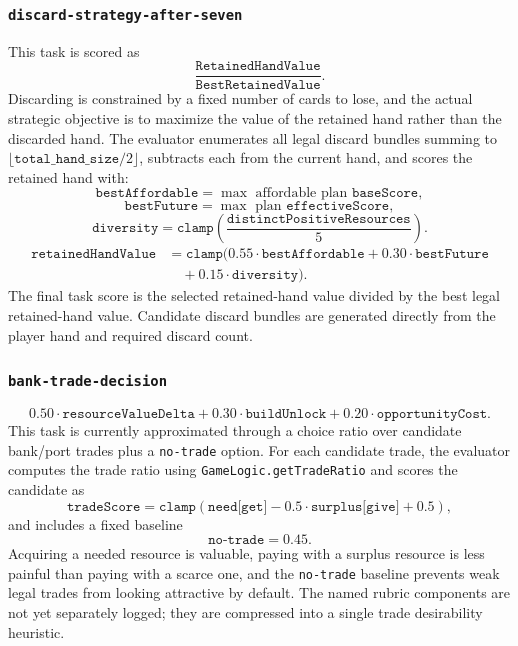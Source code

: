 \documentclass[letter,  12 pt]{article}
\begin{document}
\subsubsection{\texttt{discard-strategy-after-seven}}
\label{app:task-discard-strategy-after-seven}
This task is scored as
\[
\frac{\texttt{RetainedHandValue}}{\texttt{BestRetainedValue}}.
\]
Discarding is constrained by a fixed number of cards to lose, and the actual strategic objective is to maximize the value of the retained hand rather than the discarded hand.
The evaluator enumerates all legal discard bundles summing to $\lfloor \texttt{total\_hand\_size} / 2 \rfloor$, subtracts each from the current hand, and scores the retained hand with:
\[
\texttt{bestAffordable} = \max \text{ affordable plan } \texttt{baseScore},
\]
\[
\texttt{bestFuture} = \max \text{ plan } \texttt{effectiveScore},
\]
\[
\texttt{diversity}
= \texttt{clamp}\left(\frac{\texttt{distinctPositiveResources}}{5}\right).
\]
\[
\begin{aligned}
\texttt{retainedHandValue}
&= \texttt{clamp}(
0.55 \cdot \texttt{bestAffordable}
+ 0.30 \cdot \texttt{bestFuture} \\
&\quad + 0.15 \cdot \texttt{diversity}).
\end{aligned}
\]
The final task score is the selected retained-hand value divided by the best legal retained-hand value.
Candidate discard bundles are generated directly from the player hand and required discard count.

\subsubsection{\texttt{bank-trade-decision}}
\label{app:task-bank-trade-decision}
\[
0.50 \cdot \texttt{resourceValueDelta} +
0.30 \cdot \texttt{buildUnlock} +
0.20 \cdot \texttt{opportunityCost}.
\]
This task is currently approximated through a choice ratio over candidate bank/port trades plus a \texttt{no-trade} option. For each candidate trade, the evaluator computes the trade ratio using \texttt{GameLogic.getTradeRatio} and scores the candidate as
\[
\texttt{tradeScore}
= \texttt{clamp}\left(
\texttt{need[get]} - 0.5 \cdot \texttt{surplus[give]} + 0.5
\right),
\]
and includes a fixed baseline
\[
\texttt{no-trade} = 0.45.
\]
Acquiring a needed resource is valuable, paying with a surplus resource is less painful than paying with a scarce one, and the \texttt{no-trade} baseline prevents weak legal trades from looking attractive by default.
The named rubric components are not yet separately logged; they are compressed into a single trade desirability heuristic.
\end{document}

